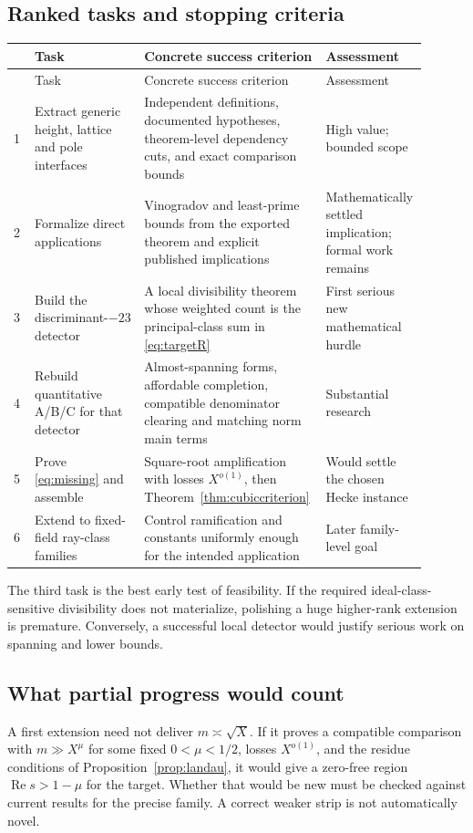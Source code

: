 \documentclass[11pt,letterpaper]{article}
\theoremstyle{definition}\newtheorem{definition}[theorem]{Definition}
\theoremstyle{remark}\newtheorem{remark}[theorem]{Remark}
\newcommand{\re}{\operatorname{Re}}\newcommand{\im}{\operatorname{Im}}
\begin{document}
\subsection{Ranked tasks and stopping criteria}
\begin{longtable}{P{0.05\linewidth}P{0.26\linewidth}P{0.43\linewidth}P{0.16\linewidth}}
\toprule
 & Task & Concrete success criterion & Assessment\\
\midrule\endfirsthead
\toprule & Task & Concrete success criterion & Assessment\\\midrule{} & Extract generic height, lattice and pole interfaces & Independent definitions, documented hypotheses, theorem-level dependency cuts, and exact comparison bounds & High value; bounded scope\\[5pt]
2 & Formalize direct applications & Vinogradov and least-prime bounds from the exported theorem and explicit published implications & Mathematically settled implication; formal work remains\\[5pt]
3 & Build the discriminant-$-23$ detector & A local divisibility theorem whose weighted count is the principal-class sum in \eqref{eq:targetR} & First serious new mathematical hurdle\\[5pt]
4 & Rebuild quantitative A/B/C for that detector & Almost-spanning forms, affordable completion, compatible denominator clearing and matching norm main terms & Substantial research\\[5pt]
5 & Prove \eqref{eq:missing} and assemble & Square-root amplification with losses $X^{o(1)}$, then Theorem~\ref{thm:cubiccriterion} & Would settle the chosen Hecke instance\\[5pt]
6 & Extend to fixed-field ray-class families & Control ramification and constants uniformly enough for the intended application & Later family-level goal\\
\bottomrule
\end{longtable}

The third task is the best early test of feasibility. If the required ideal-class-sensitive
divisibility does not materialize, polishing a huge higher-rank extension is premature.
Conversely, a successful local detector would justify serious work on spanning and lower bounds.

\subsection{What partial progress would count}
A first extension need not deliver $m\asymp\sqrt X$. If it proves a compatible comparison with
$m\gg X^\mu$ for some fixed $0<\mu<1/2$, losses $X^{o(1)}$, and the residue conditions of
Proposition~\ref{prop:landau}, it would give a zero-free region
$\re s>1-\mu$ for the target. Whether that would be new must be checked against current
results for the precise family. A correct weaker strip is not automatically novel.
\end{document}
